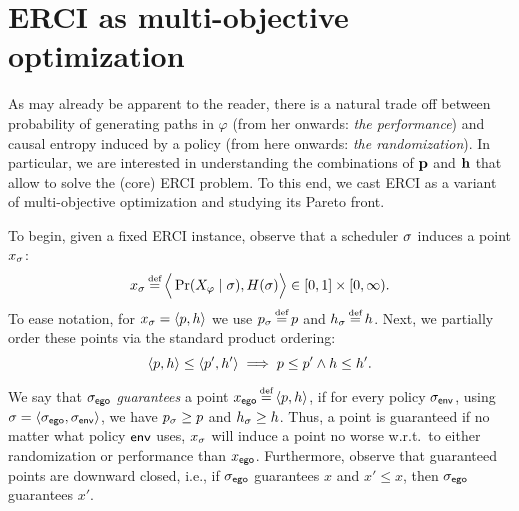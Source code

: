 \section{ERCI as multi-objective optimization}\label{sec:convex}
As may already be apparent to the reader, there is a natural trade off
between probability of generating paths in $\varphi$ (from her
onwards: \emph{the performance}) and causal entropy induced by a
policy (from here onwards: \emph{the randomization}).  In particular,
we are interested in understanding the combinations of $\mathbf{p}$
and $\mathbf{h}$ that allow to solve the (core) ERCI problem. To this
end, we cast ERCI as a variant of multi-objective optimization and
studying its Pareto front.

To begin, given a fixed ERCI instance, observe that a scheduler $\sigma$
induces a point $x_\sigma$:
\begin{equation}
  x_\sched \eqdef \Big\langle \Pr(X_\varphi \mid \sched), H(\sched) \Big\rangle \in [0,1] \times [0,\infty).  
\end{equation}
To ease notation, for $x_\sigma = \langle p,h \rangle$ we use
$\scp_\sched \eqdef \scp$ and $\rndp_\sched \eqdef \rndp$. Next, we
partially order these points via the standard product ordering:
\begin{equation}
  \langle p,h \rangle \leq \langle p',h' \rangle \implies p \leq p' \wedge h \leq h'.
\end{equation}

We say that ${\sigma_{\mathsf{ego}}}$ \emph{guarantees} a point $x_\pOne \eqdef
\langle \scp, \rndp \rangle$, if for every policy ${\sigma_{\mathsf{env}}}$, using
$\sigma = \langle {\sigma_{\mathsf{ego}}}, {\sigma_{\mathsf{env}}} \rangle$, we have
$p_\sigma \geq p$ and $h_\sigma \geq h$. Thus, a point
is guaranteed if no matter what policy $\mathsf{env}$ uses, $x_\sigma$ will
induce a point no worse w.r.t.\ to either randomization or performance
than $x_{\mathsf{ego}}$. Furthermore, observe that guaranteed points are
downward closed, i.e., if ${\sigma_{\mathsf{ego}}}$ guarantees $x$ and $x' \leq x$,
then ${\sigma_{\mathsf{ego}}}$ guarantees $x'$.

